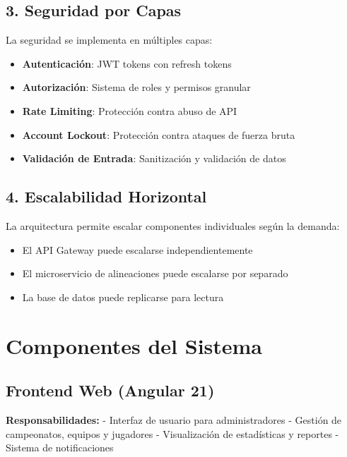\documentclass[
  spanish,
  11pt,
  letterpaper,
]{book}
\providecommand{\tightlist}{%
  \setlength{\itemsep}{0pt}\setlength{\parskip}{0pt}}
\begin{document}
\subsection{3. Seguridad por Capas}\label{seguridad-por-capas}

La seguridad se implementa en múltiples capas:

\begin{itemize}
\tightlist
\item
  \textbf{Autenticación}: JWT tokens con refresh tokens
\item
  \textbf{Autorización}: Sistema de roles y permisos granular
\item
  \textbf{Rate Limiting}: Protección contra abuso de API
\item
  \textbf{Account Lockout}: Protección contra ataques de fuerza bruta
\item
  \textbf{Validación de Entrada}: Sanitización y validación de datos
\end{itemize}

\subsection{4. Escalabilidad Horizontal}\label{escalabilidad-horizontal}

La arquitectura permite escalar componentes individuales según la
demanda:

\begin{itemize}
\tightlist
\item
  El API Gateway puede escalarse independientemente
\item
  El microservicio de alineaciones puede escalarse por separado
\item
  La base de datos puede replicarse para lectura
\end{itemize}

\section{Componentes del Sistema}\label{componentes-del-sistema-1}

\subsection{Frontend Web (Angular 21)}\label{frontend-web-angular-21}

\textbf{Responsabilidades:} - Interfaz de usuario para administradores -
Gestión de campeonatos, equipos y jugadores - Visualización de
estadísticas y reportes - Sistema de notificaciones
\end{document}
